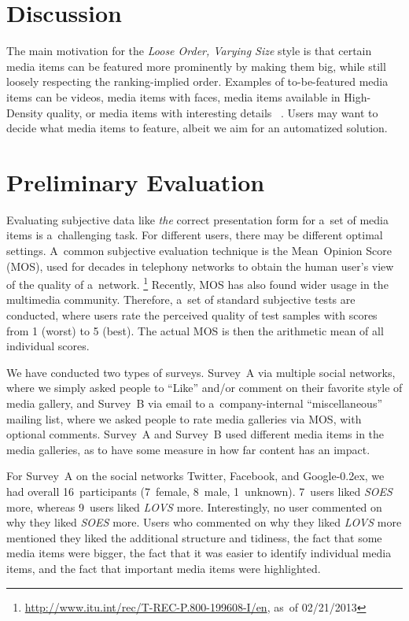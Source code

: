 \documentclass{sig-alt-release2}
\DeclareRobustCommand{\googleplus}{\mbox{Google\hspace{0em}\raisebox{.28ex}{\tiny\bf +}\kern-0.2ex}\xspace}
\newcommand{\inlinelistingsize}{\fontsize{8pt}{11pt}}
\let\oldurl\url
\renewcommand{\url}[1]{\inlinelistingsize\oldurl{#1}}
\begin{document}
\section{Discussion}

The main motivation for the \emph{Loose Order, Varying Size} style
is that certain media items can be featured more prominently
by making them big, while still loosely respecting the ranking-implied order.
Examples of to-be-featured media items can be videos,
media items with faces, media items available in High-Density quality,
or media items with interesting details~%
\cite{suh2003thumbnail}.
Users may want to decide what media items to feature,
albeit we aim for an automatized solution.

\section{Preliminary Evaluation}

Evaluating subjective data like \emph{the} correct presentation form
for a~set of media items is a~challenging task.
For different users, there may be different optimal settings.
A~common subjective evaluation technique
is the Mean~Opinion Score (MOS),
used for decades in telephony networks to
obtain the human user's view of the quality of a~network.%
\footnote{\url{http://www.itu.int/rec/T-REC-P.800-199608-I/en},
as~of 02/21/2013}
Recently, MOS has also found wider usage in the multimedia community.
Therefore, a~set of standard subjective tests are conducted,
where users rate the perceived quality of test samples
with scores from 1 (worst) to 5 (best).
The actual MOS is then the arithmetic mean of all individual scores.

We have conducted two types of surveys. 
Survey~A via multiple social networks, where we simply asked people to ``Like''
and/or comment on their favorite style of media gallery,
and Survey~B via email to a~company-internal ``miscellaneous'' mailing list,
where we asked people to rate media galleries via MOS, with optional comments. 
Survey~A and Survey~B used different media items in the media galleries,
as to have some measure in how far content has an impact.

For Survey~A on the social networks Twitter, Facebook,
and \googleplus, we had overall 16~participants (7~female, 8~male, 1~unknown).
7~users liked \emph{SOES} more,
whereas 9~users liked \emph{LOVS} more.
Interestingly, no user commented on why they liked \emph{SOES} more.
Users who commented on why they liked \emph{LOVS} more mentioned
they liked the additional structure and tidiness,
the fact that some media items were bigger,
the fact that it was easier to identify individual media items,
and the fact that important media items were highlighted.
\end{document}
